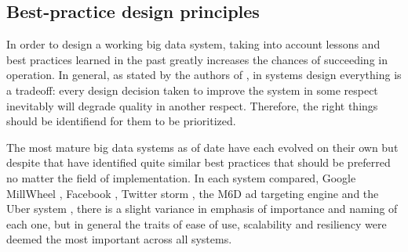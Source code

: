 \subsection{Best-practice design principles}








In order to design a working big data system, taking into account lessons and best practices learned in the past greatly increases the chances of succeeding in operation. In general, as stated by the authors of \cite{uber}, in systems design everything is a tradeoff: every design decision taken to improve the system in some respect inevitably will degrade quality in another respect. Therefore, the right things should be identifiend for them to be prioritized.

The most mature big data systems as of date have each evolved on their own but despite that have identified quite similar best practices that should be preferred no matter the field of implementation. In each system compared, Google MillWheel \cite{millwheel}, Facebook \cite{facebook}, Twitter storm \cite{storm@twitter}, the M6D ad targeting engine \cite{designprinciples} and the Uber system \cite{uber}, there is a slight variance in emphasis of importance and naming of each one, but in general the traits of ease of use, scalability and resiliency were deemed the most important across all systems.

